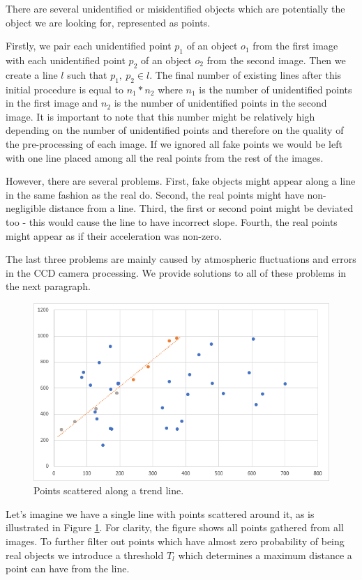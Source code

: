 	There are several unidentified or misidentified objects which are potentially the object we are looking for, represented as points. 
	
	Firstly, we pair each unidentified point $p_1$ of an object $o_1$ from the first image with each unidentified point $p_2$ of an object $o_2$ from the second image. Then we create a line $l$ such that $p_1,\ p_2 \in l$. The final number of existing lines after this initial procedure is equal to $n_1 * n_2$ where $n_1$ is the number of unidentified points in the first image and $n_2$ is the number of unidentified points in the second image. It is important to note that this number might be relatively high depending on the number of unidentified points and therefore on the quality of the pre-processing of each image. If we ignored all fake points we would be left with one line placed among all the real points from the rest of the images.
	
	However, there are several problems. First, fake objects might appear along a line in the same fashion as the real do. Second, the real points might have non-negligible distance from a line. Third, the first or second point might be deviated too - this would cause the line to have incorrect slope. Fourth, the real points might appear as if their acceleration was non-zero. 
	
	The last three problems are mainly caused by atmospheric fluctuations and errors in the CCD camera processing. We provide solutions to all of these problems in the next paragraph.
	
	\begin{figure}[H]
	\centering
	  \includegraphics[width=12cm]{images/regresia1}
		  \caption{Points scattered along a trend line.}
	  \label{fig:regresia1}
	\end{figure}
	
	Let's imagine we have a single line with points scattered around it, as is illustrated in Figure \ref{fig:regresia1}. For clarity, the figure shows all points gathered from all images. To further filter out points which have almost zero probability of being real objects we introduce a threshold $T_l$ which determines a maximum distance a point can have from the line. 
	
